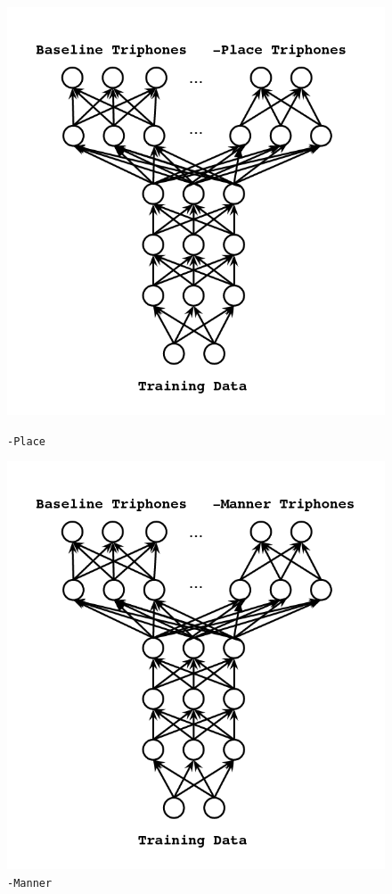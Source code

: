 \documentclass[10pt,a4paper]{article}
\begin{document}
\begin{enumerate}
\begin{figure}[!htb]
  \includegraphics[width=\linewidth]{figs/mtl-arch-place.png}
  \caption{\texttt{-Place}}
\endminipage\hfill
{}%
  \includegraphics[width=\linewidth]{figs/mtl-arch-manner.png}
  \caption{\texttt{-Manner}}
\endminipage
\end{figure}




\end{enumerate}
\end{document}
